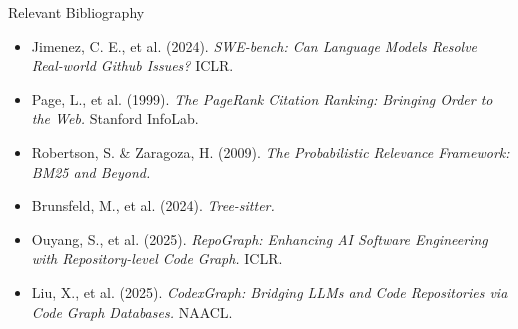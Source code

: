 \documentclass[aspectratio=169]{beamer}
\begin{document}
\begin{frame}{Relevant Bibliography}
  \small
  \begin{itemize}
    \setlength\itemsep{0.5em}
    \item Jimenez, C. E., et al. (2024). \textit{SWE-bench: Can Language Models Resolve Real-world Github Issues?} ICLR.
    \item Page, L., et al. (1999). \textit{The PageRank Citation Ranking: Bringing Order to the Web.} Stanford InfoLab.
    \item Robertson, S. \& Zaragoza, H. (2009). \textit{The Probabilistic Relevance Framework: BM25 and Beyond.}
    \item Brunsfeld, M., et al. (2024). \textit{Tree-sitter.}
    \item Ouyang, S., et al. (2025). \textit{RepoGraph: Enhancing AI Software Engineering with Repository-level Code Graph.} ICLR.
    \item Liu, X., et al. (2025). \textit{CodexGraph: Bridging LLMs and Code Repositories via Code Graph Databases.} NAACL.
  \end{itemize}
\end{frame}
\end{document}
